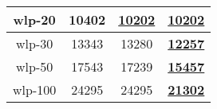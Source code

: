 \documentclass{article}
\newcommand{\sol}[1]{#1}
\newcommand{\proved}[1]{\textbf{\underline{#1}}}
\begin{document}
\begin{table}[H]
\begin{center}
\begin{tabular}{|c|c|c|c|}
            \hline
            wlp-20        &     \sol{10402}     &   \proved{10202}  &   \proved{10202}  \\
            \hline
            wlp-30        &     \sol{13343}     &   \sol{13280}     &   \proved{12257}  \\
            \hline
            wlp-50        &     \sol{17543}     &   \sol{17239}     &   \proved{15457}  \\
            \hline
            wlp-100       &     \sol{24295}     &   \sol{24295}     &   \proved{21302}  \\
            \hline
        \end{tabular}
    \end{center}
\end{table}
\end{document}
